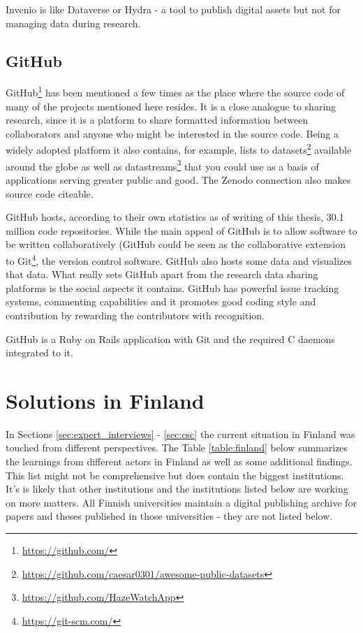 Invenio is like Dataverse or Hydra - a tool to publish digital assets but not
for managing data during research.

\subsection{GitHub}

GitHub\footnote{\url{https://github.com/}} has been mentioned a few times as
the place where the source code of many of the projects mentioned here resides.
It is a close analogue to sharing research, since it is a platform to share
formatted information between collaborators and anyone who might be interested
in the source code. Being a widely adopted platform it also contains, for
example, lists to datasets\footnote{\url{https://github.com/caesar0301/awesome-public-datasets}}
available around the globe as well as datastreams\footnote{\url{https://github.com/HazeWatchApp}}
that you could use as a basis of applications serving greater public and good.
The Zenodo connection also makes source code citeable.

GitHub hosts, according to their own statistics as of writing of this thesis,
30.1 million code repositories. While the main appeal of GitHub is to allow
software to be written collaboratively (GitHub could be seen as the
collaborative extension to Git\footnote{\url{https://git-scm.com/}}, the
version control software. GitHub also hosts some data and visualizes that data.
What really sets GitHub apart from the research data sharing platforms is the
social aspects it contains. GitHub has powerful issue tracking systems,
commenting capabilities and it promotes good coding style and contribution
by rewarding the contributors with recognition.

GitHub is a Ruby on Rails application with Git and the required C daemons
integrated to it.

\clearpage

\section{Solutions in Finland}
\label{sec:finland_current}

In Sections \ref{sec:expert_interviews} - \ref{sec:csc} the current situation
in Finland was touched from different perspectives. The Table \ref{table:finland} below summarizes
the learnings from different actors in Finland as well as some additional
findings. This list might not be comprehensive but does contain the biggest
institutions. It's is likely that other institutions and the institutions listed
below are working on more matters. All Finnish universities maintain a digital
publishing archive for papers and theses published in those universities - they
are not listed below.

